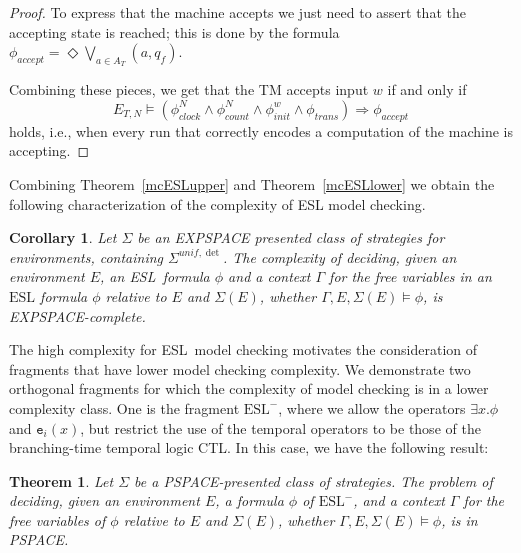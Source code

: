 \documentclass[a4wide]{article}
\newcommand{\ESL}{\mbox{ESL}}
\newtheorem{cor}{Corollary}
\newtheorem{theorem}{Theorem}
\theoremstyle{examplesty}
\newcommand{\existsg}[1]{\exists #1.}
\newcommand{\lid}[2]{\mathtt{e}_{#1}(#2)}
\newcommand{\rimp}{\Rightarrow}
\newcommand{\Env}{E}
\newcommand{\unif}{\mathit{unif}}
\newcommand{\Strat}{\Sigma}
\newcommand{\Strats}{\Sigma}
\newcommand{\Cont}{\Gamma}
\begin{document}
\begin{proof}
To express that the machine accepts we just need to assert that the accepting state is reached; this 
is done by the formula 
$\phi_{accept} =  \Diamond  \bigvee_{a\in A_T}(a,q_f)$. 

Combining these pieces, we get that the TM accepts input $w$ 
if and only if 
$$\Env_{T,N} \models (\phi^N_{clock} \land \phi^N_{count} \land  \phi^w_{init} \land  \phi_{trans}) \rimp  \phi_{accept} $$
holds, i.e., when every run that correctly encodes a computation of the machine is accepting. 

\end{proof} 


Combining Theorem~\ref{mcESLupper} and Theorem~\ref{mcESLlower} we
obtain the following characterization of the complexity of ESL model checking. 


\begin{cor} 
Let 
$\Strats$  be an EXPSPACE presented class of strategies for environments, containing $\Strats^{\unif,\det}$. 
The complexity of deciding, given an environment $\Env$, an \ESL\ formula $\phi$ 
and a context $\Cont$ for the free variables in an $\ESL$  formula $\phi$ relative
to $\Env$ and $\Strats(\Env)$,  whether $\Cont, \Env,\Strat(\Env)\models \phi$, is EXPSPACE-complete. 
\end{cor} 


The high  complexity for \ESL\  model checking motivates the consideration of 
fragments that have lower model checking complexity. We demonstrate
two orthogonal fragments for which the complexity of model checking is in a lower complexity class.  
One is the fragment $\ESL^-$, where we allow the operators $\existsg{x} \phi$ and $\lid{i}{x}$, 
but restrict the use of the temporal operators to be those of the branching-time temporal logic CTL. 
In this case, we have the following result: 

\begin{theorem} \label{mcESLminus} 
Let $\Strat$ be a PSPACE-presented class of strategies. 
The problem of deciding, given an environment $\Env$, a formula $\phi$ of $\ESL^-$, and a context $\Cont$ for the free variables of $\phi$ relative to $\Env$ and $\Strat(\Env)$, whether
$\Cont, \Env, \Strat(\Env) \models \phi$, is  in  PSPACE. 
\end{theorem}
\end{document}
